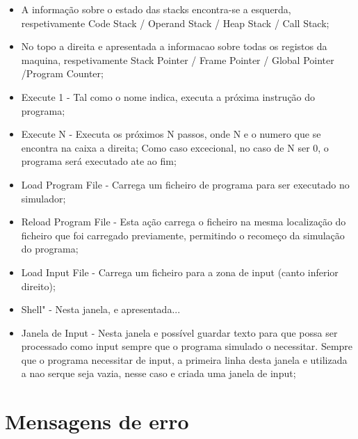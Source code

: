 \documentclass{report}
\begin{document}
	\begin{itemize}
		\item A informação sobre o estado das stacks encontra-se a esquerda, respetivamente
		 Code Stack / Operand Stack / Heap Stack /	Call Stack;
		\item No topo a direita e apresentada a informacao sobre todas os registos da maquina, respetivamente
			Stack Pointer / Frame Pointer /	Global Pointer /Program Counter;
		\item Execute 1 - Tal como o nome indica, executa a próxima instrução do programa;
		\item Execute N - Executa os próximos N passos, onde N e o numero que se encontra na caixa a direita; Como caso excecional,
		no caso de N ser 0, o programa será executado ate ao fim;
		\item Load Program File - Carrega um ficheiro de programa para ser executado no simulador;
		\item Reload Program File - Esta ação carrega o ficheiro na	mesma localização do ficheiro que foi carregado previamente,
		permitindo o recomeço da simulação do programa;
		\item Load Input File - Carrega um ficheiro para a zona de input (canto inferior direito);
		\item Shell" - Nesta janela, e apresentada...
		\item Janela de Input - Nesta janela e possível guardar texto para que possa ser processado como input sempre que
		o programa simulado o necessitar. Sempre que o programa necessitar de input, a primeira linha desta janela e utilizada
		a nao serque seja vazia, nesse caso e criada uma janela de input;
	\end{itemize}


\section{Mensagens de erro}
\end{document}
